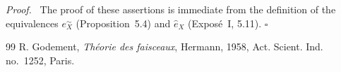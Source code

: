 \documentclass[11pt]{article}
\newcommand{\qedtext}{\hfill\(\square\)}
\newenvironment{prooftext}{\par\noindent\emph{Proof.}\ }{\par\medskip}
\begin{document}
\begin{prooftext}
The proof of these assertions is immediate from the definition of the equivalences \(e_X^{\sim}\) (Proposition~5.4) and \(\widehat e_X\) (Expos\'e~I, 5.11). \qedtext
\end{prooftext}

\begin{thebibliography}{99}
 R. Godement, \emph{Th\'eorie des faisceaux}, Hermann, 1958, Act. Scient. Ind. no.~1252, Paris.
\end{thebibliography}
\end{document}

